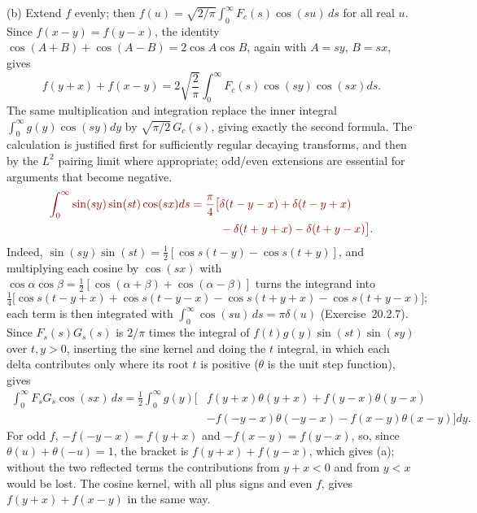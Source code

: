 (b) Extend $f$ evenly; then
$f(u)=\sqrt{2/\pi}\int_0^\infty F_c(s)\cos(su)\,ds$ for all
real $u$. Since $f(x-y)=f(y-x)$, the identity
$\cos(A+B)+\cos(A-B)=2\cos A\cos B$, again with $A=sy$,
$B=sx$, gives
\[
f(y+x)+f(x-y)=2\sqrt{\frac2\pi}\int_0^\infty
F_c(s)\cos(sy)\cos(sx)ds.
\]
The same multiplication and integration replace the inner
integral $\int_0^\infty g(y)\cos(sy)dy$ by $\sqrt{\pi/2}\,G_c(s)$,
giving exactly the second
formula. The calculation is justified first for sufficiently
regular decaying transforms, and then by the $L^2$ pairing
limit where appropriate; odd/even extensions are essential for
arguments that become negative.
\[
\erratum{\begin{aligned}
\int_0^\infty\sin(sy)\sin(st)\cos(sx)ds
=\frac\pi4\big[&\delta(t-y-x)+\delta(t-y+x)\\
&-\delta(t+y+x)-\delta(t+y-x)\big].
\end{aligned}}
\]
Indeed, $\sin(sy)\sin(st)=\frac12[\cos s(t-y)-\cos s(t+y)]$,
and multiplying each cosine by $\cos(sx)$ with
$\cos\alpha\cos\beta=\frac12[\cos(\alpha+\beta)+\cos(\alpha-\beta)]$
turns the integrand into
\[
\tfrac14\big[\cos s(t-y+x)+\cos s(t-y-x)
-\cos s(t+y+x)-\cos s(t+y-x)\big];
\]
each term is then integrated with
$\int_0^\infty\cos(su)\,ds=\pi\delta(u)$ (Exercise~20.2.7).
Since $F_s(s)G_s(s)$ is $2/\pi$ times the integral of
$f(t)g(y)\sin(st)\sin(sy)$ over $t,y>0$, inserting the sine
kernel and doing the $t$ integral, in which each delta
contributes only where its root $t$ is positive ($\theta$ is the
unit step function), gives
\[
\begin{aligned}
\int_0^\infty F_sG_s\cos(sx)\,ds
=\frac12\int_0^\infty g(y)\big[&f(y+x)\theta(y+x)+f(y-x)\theta(y-x)\\
&-f(-y-x)\theta(-y-x)-f(x-y)\theta(x-y)\big]dy.
\end{aligned}
\]
For odd $f$, $-f(-y-x)=f(y+x)$ and $-f(x-y)=f(y-x)$, so, since
$\theta(u)+\theta(-u)=1$, the bracket is $f(y+x)+f(y-x)$, which
gives (a); without the two
reflected terms the contributions from $y+x<0$ and from $y<x$
would be lost. The cosine kernel, with all plus signs and even
$f$, gives $f(y+x)+f(x-y)$ in the same way.

